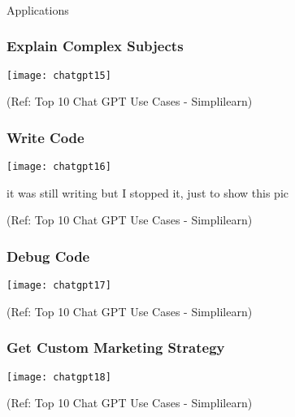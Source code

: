 \begin{frame}[fragile]\frametitle{}
\begin{center}
{\Large Applications}
\end{center}
\end{frame}




\begin{frame}[fragile]\frametitle{Explain Complex Subjects}
\begin{center}
\texttt{[image: chatgpt15]}
\end{center}
	
{\tiny (Ref: Top 10 Chat GPT Use Cases - Simplilearn)}
\end{frame}

\begin{frame}[fragile]\frametitle{Write Code}
\begin{center}
\texttt{[image: chatgpt16]}
\end{center}

it was still writing but I stopped it, just to show this pic

{\tiny (Ref: Top 10 Chat GPT Use Cases - Simplilearn)}
\end{frame}

\begin{frame}[fragile]\frametitle{Debug Code}
\begin{center}
\texttt{[image: chatgpt17]}
\end{center}

{\tiny (Ref: Top 10 Chat GPT Use Cases - Simplilearn)}
\end{frame}

\begin{frame}[fragile]\frametitle{Get Custom Marketing Strategy}
\begin{center}
\texttt{[image: chatgpt18]}
\end{center}

{\tiny (Ref: Top 10 Chat GPT Use Cases - Simplilearn)}
\end{frame}

